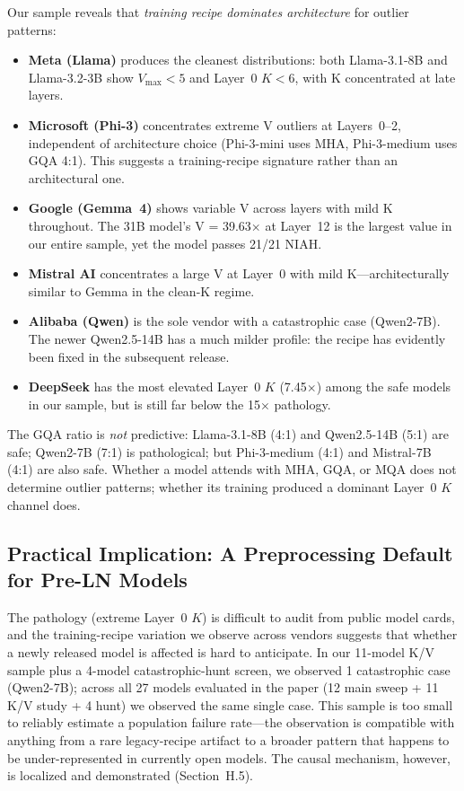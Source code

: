\documentclass[11pt]{article}
\begin{document}
Our sample reveals that \emph{training recipe dominates architecture} for outlier patterns:
\begin{itemize}[nosep]
    \item \textbf{Meta (Llama)} produces the cleanest distributions: both Llama-3.1-8B and Llama-3.2-3B show $V_{\max} < 5$ and Layer~0 $K < 6$, with K concentrated at late layers.
    \item \textbf{Microsoft (Phi-3)} concentrates extreme V outliers at Layers~0--2, independent of architecture choice (Phi-3-mini uses MHA, Phi-3-medium uses GQA 4:1). This suggests a training-recipe signature rather than an architectural one.
    \item \textbf{Google (Gemma~4)} shows variable V across layers with mild K throughout. The 31B model's V = 39.63$\times$ at Layer~12 is the largest value in our entire sample, yet the model passes 21/21 NIAH.
    \item \textbf{Mistral AI} concentrates a large V at Layer~0 with mild K---architecturally similar to Gemma in the clean-K regime.
    \item \textbf{Alibaba (Qwen)} is the sole vendor with a catastrophic case (Qwen2-7B). The newer Qwen2.5-14B has a much milder profile: the recipe has evidently been fixed in the subsequent release.
    \item \textbf{DeepSeek} has the most elevated Layer~0 $K$ (7.45$\times$) among the safe models in our sample, but is still far below the 15$\times$ pathology.
\end{itemize}

The GQA ratio is \emph{not} predictive: Llama-3.1-8B (4:1) and Qwen2.5-14B (5:1) are safe; Qwen2-7B (7:1) is pathological; but Phi-3-medium (4:1) and Mistral-7B (4:1) are also safe. Whether a model attends with MHA, GQA, or MQA does not determine outlier patterns; whether its training produced a dominant Layer~0 $K$ channel does.

\subsection{Practical Implication: A Preprocessing Default for Pre-LN Models}

The pathology (extreme Layer~0 $K$) is difficult to audit from public model cards, and the training-recipe variation we observe across vendors suggests that whether a newly released model is affected is hard to anticipate. In our 11-model K/V sample plus a 4-model catastrophic-hunt screen, we observed 1 catastrophic case (Qwen2-7B); across all 27 models evaluated in the paper (12 main sweep + 11 K/V study + 4 hunt) we observed the same single case. This sample is too small to reliably estimate a population failure rate---the observation is compatible with anything from a rare legacy-recipe artifact to a broader pattern that happens to be under-represented in currently open models. The causal mechanism, however, is localized and demonstrated (Section~H.5).
\end{document}

